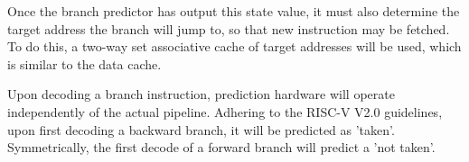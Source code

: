 \documentclass[11pt]{article}
\begin{document}
Once the branch predictor has output this state value, it must also determine the target address the branch will jump to, so that new instruction may be fetched. To do this, a two-way set associative cache of target addresses will be used, which is similar to the data cache. 


Upon decoding a branch instruction, prediction hardware will operate independently of the actual pipeline. Adhering to the RISC-V V2.0 guidelines, upon first decoding a backward branch, it will be predicted as 'taken'. Symmetrically, the first decode of a forward branch will predict a 'not taken'. 
\end{document}
